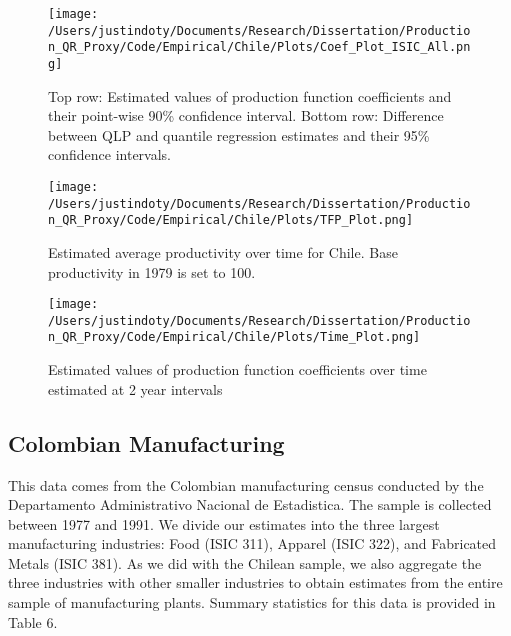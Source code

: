 \documentclass[11pt]{article}
\begin{document}
\begin{figure}[H]
\centering
\texttt{[image: /Users/justindoty/Documents/Research/Dissertation/Production\_QR\_Proxy/Code/Empirical/Chile/Plots/Coef\_Plot\_ISIC\_All.png]}
\caption{Top row: Estimated values of production function coefficients and their point-wise 90\% confidence interval. Bottom row: Difference between QLP and quantile regression estimates and their 95\% confidence intervals.}
\label{fig:CHLall}
\end{figure}



\begin{figure}[H]
\centering
\texttt{[image: /Users/justindoty/Documents/Research/Dissertation/Production\_QR\_Proxy/Code/Empirical/Chile/Plots/TFP\_Plot.png]}
\caption{Estimated average productivity over time for Chile. Base productivity in 1979 is set to 100.}
\label{fig:CHLpgrowth}
\end{figure}

\begin{figure}[H]
\centering
\texttt{[image: /Users/justindoty/Documents/Research/Dissertation/Production\_QR\_Proxy/Code/Empirical/Chile/Plots/Time\_Plot.png]}
\caption{Estimated values of production function coefficients over time estimated at 2 year intervals}
\label{fig:CHLtimecoef}
\end{figure}



\subsection{Colombian Manufacturing}
This data comes from the Colombian manufacturing census conducted by the Departamento Administrativo Nacional de Estadistica. The sample is collected between 1977 and 1991. We divide our estimates into the three largest manufacturing industries: Food (ISIC 311), Apparel (ISIC 322), and Fabricated Metals (ISIC 381). As we did with the Chilean sample, we also aggregate the three industries with other smaller industries to obtain estimates from the entire sample of manufacturing plants. Summary statistics for this data is provided in Table 6.


\end{document}
